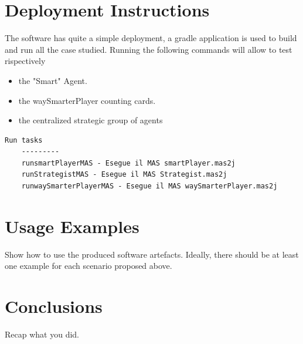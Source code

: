 \chapter{Deployment Instructions}

The software has quite a simple deployment, a gradle application is used to build and run all the case studied. Running the following commands will allow to test rispectively
\begin{itemize}
    \item the "Smart" Agent.
    \item the waySmarterPlayer counting cards.
    \item the centralized strategic group of agents
\end{itemize}



\begin{lstlisting}[style=gradlestyle, caption=Runnable tasks, label=lst:bash_tasks]
    Run tasks
    ---------
    runsmartPlayerMAS - Esegue il MAS smartPlayer.mas2j
    runStrategistMAS - Esegue il MAS Strategist.mas2j
    runwaySmarterPlayerMAS - Esegue il MAS waySmarterPlayer.mas2j
\end{lstlisting}

\chapter{Usage Examples}
Show how to use the produced software artefacts. Ideally, there should be at least one
example for each scenario proposed above.
\chapter{Conclusions}
Recap what you did.